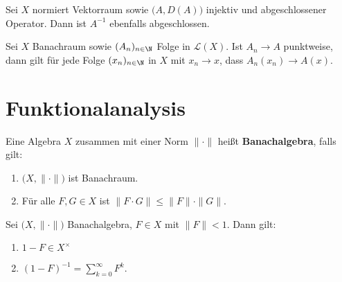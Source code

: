 \begin{prop}\cite{}\label{Hinreichende Bedingung für Abgeschlossenheit der Inverse eines Operators}
Sei $X$ normiert Vektorraum sowie $\big(A, D(A)\big)$ injektiv und abgeschlossener Operator. Dann ist $A^{-1}$ ebenfalls abgeschlossen.
\end{prop}


\begin{lem}\cite{}\label{Punktweise Konvergenz von Folgen und Operatoren}
Sei $X$ Banachraum sowie $(A_n)_{n\in\N}$ Folge in $\mathcal L(X)$. Ist $A_n\to A$ punktweise, dann gilt für jede Folge $(x_n)_{n\in\N}$ in $X$ mit $x_n\to x$, dass $A_n(x_n)\to A(x)$.
\end{lem}


\section{Funktionalanalysis}

\begin{defi}[Banachalgebra]
Eine Algebra $X$ zusammen mit einer Norm $\|\cdot\|$ heißt \textbf{Banachalgebra}, falls gilt:
\begin{enumerate}
\item $\big(X,\|\cdot\|\big)$ ist Banachraum.
\item Für alle $F,G\in X$ ist $\|F\cdot G\|\leq \|F\|\cdot\|G\|$.
\end{enumerate}
\end{defi}

\begin{fsatz}\cite{banasiak_arlotti_2006}\label{Satz von der Neumann'schen Reihe}
Sei $\big(X,\|\cdot\|\big)$ Banachalgebra, $F\in X$ mit $\|F\| < 1$. Dann gilt:
\begin{enumerate}
    \item $1-F\in X^\times$
    \item  $(1-F)^{-1}=\sum_{k=0}^\infty F^k$.
\end{enumerate}
\end{fsatz}

